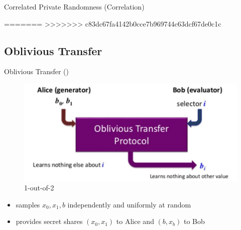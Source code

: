 \begin{frame}{Correlated Private Randomness (Correlation)}
\end{frame}

=======
>>>>>>> c83dc67fa4142b0cce7b969744c63dcf67de0c1c
%	
		
\subsection{Oblivious Transfer}
\begin{frame}{Oblivious Transfer (\OT)}
	\begin{figure}
		\begin{center}
			\includegraphics[scale = 0.5]{OT-1}
		\end{center}
	\caption{1-out-of-2 \OT}
	\end{figure}
	
	\begin{definition}
	\begin{itemize}
		\item samples $ x_0, x_1, b  $ independently and uniformly at random 
		\item provides secret shares $ (x_0, x_1) $ to Alice and $ (b, x_b) $ to Bob
	\end{itemize}
	\end{definition}
\end{frame}

